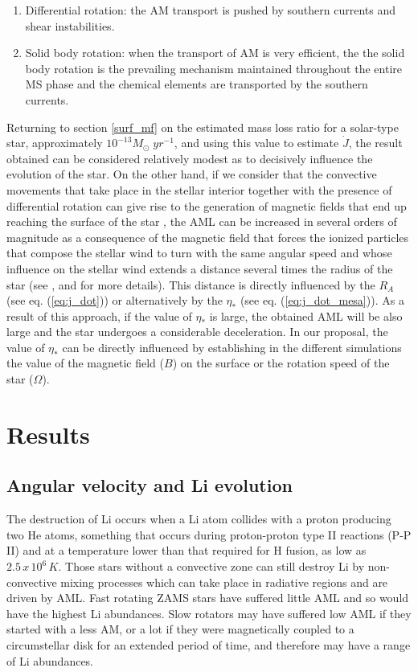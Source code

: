 \documentclass[fleqn,usenatbib]{mnras}
\begin{document}
\begin{enumerate}
    \item Differential rotation: the AM transport is pushed by southern currents and shear instabilities.
    \item Solid body rotation: when the transport of AM is very efficient, the the solid body rotation is the prevailing mechanism maintained throughout the entire MS phase and the chemical elements are transported by the southern currents.
\end{enumerate}

Returning to section \ref{surf_mf} on the estimated mass loss ratio for a solar-type star, approximately $10^{-13}M_{\odot} \; yr^{-1}$, and using this value to estimate $\Dot{J}$, the result obtained can be considered relatively modest as to decisively influence the evolution of the star. On the other hand, if we consider that the convective movements that take place in the stellar interior together with the presence of differential rotation can give rise to the generation of magnetic fields that end up reaching the surface of the star \citep{Langer2012}, the AML can be increased in several orders of magnitude as a consequence of the magnetic field that forces the ionized particles that compose the stellar wind to turn with the same angular speed and whose influence on the stellar wind extends a distance several times the radius of the star (see \citet{UdDoula2002}, \citet{Ud-Doula2007} and \citet{Ud-Doula2008} for more details). This distance is directly influenced by the $R_A$ (see eq. (\ref{eq:j_dot})) or alternatively by the $\eta_*$ (see eq. (\ref{eq:j_dot_mesa})). As a result of this approach, if the value of $\eta_*$ is large, the obtained AML will be also large and the star undergoes a considerable deceleration. In our proposal, the value of $\eta_*$ can be directly influenced by establishing in the different simulations the value of the magnetic field ($B$) on the surface or the rotation speed of the star ($\Omega$). 

\section{Results}
\subsection{Angular velocity and Li evolution}
The destruction of Li occurs when a Li atom collides with a proton producing two He atoms, something that occurs during proton-proton type II reactions (P-P II) and at a temperature lower than that required for H fusion, as low as $2.5\, x\, 10^6\, K$. Those stars without a convective zone can still destroy Li by non-convective mixing processes which can take place in radiative regions and are driven by AML. Fast rotating ZAMS stars have suffered little AML and so would have the highest Li abundances. Slow rotators may have suffered low AML if they started with a less AM, or a lot if they were magnetically coupled to a circumstellar disk for an extended period of time, and therefore may have a range of Li abundances. \par
\end{document}
